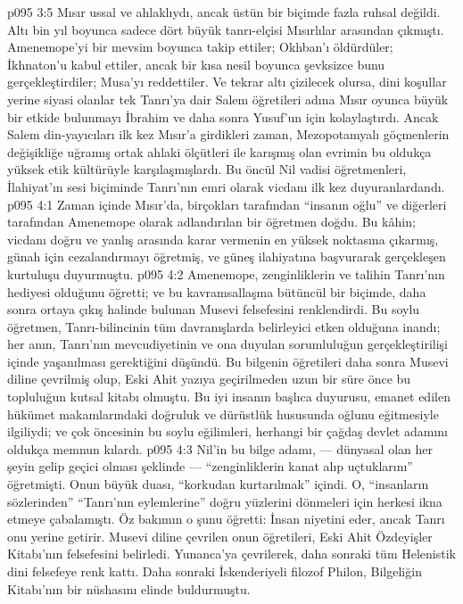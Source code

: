 \vs p095 3:5 Mısır ussal ve ahlaklıydı, ancak üstün bir biçimde fazla ruhsal değildi. Altı bin yıl boyunca sadece dört büyük tanrı\hyp{}elçisi Mısırlılar arasından çıkmıştı. Amenemope’yi bir mevsim boyunca takip ettiler; Okhban’ı öldürdüler; İkhnaton’u kabul ettiler, ancak bir kısa nesil boyunca şevksizce bunu gerçekleştirdiler; Musa’yı reddettiler. Ve tekrar altı çizilecek olursa, dini koşullar yerine siyasi olanlar tek Tanrı’ya dair Salem öğretileri adına Mısır oyunca büyük bir etkide bulunmayı İbrahim ve daha sonra Yusuf’un için kolaylaştırdı. Ancak Salem din\hyp{}yayıcıları ilk kez Mısır’a girdikleri zaman, Mezopotamyalı göçmenlerin değişikliğe uğramış ortak ahlaki ölçütleri ile karışmış olan evrimin bu oldukça yüksek etik kültürüyle karşılaşmışlardı. Bu öncül Nil vadisi öğretmenleri, İlahiyat’ın sesi biçiminde Tanrı’nın emri olarak vicdanı ilk kez duyuranlardandı.
\vs p095 4:1 Zaman içinde Mısır’da, birçokları tarafından “insanın oğlu” ve diğerleri tarafından Amenemope olarak adlandırılan bir öğretmen doğdu. Bu kâhin; vicdanı doğru ve yanlış arasında karar vermenin en yüksek noktasına çıkarmış, günah için cezalandırmayı öğretmiş, ve güneş ilahiyatına başvurarak gerçekleşen kurtuluşu duyurmuştu.
\vs p095 4:2 Amenemope, zenginliklerin ve talihin Tanrı’nın hediyesi olduğunu öğretti; ve bu kavramsallaşma bütüncül bir biçimde, daha sonra ortaya çıkış halinde bulunan Musevi felsefesini renklendirdi. Bu soylu öğretmen, Tanrı\hyp{}bilincinin tüm davranışlarda belirleyici etken olduğuna inandı; her anın, Tanrı’nın mevcudiyetinin ve ona duyulan sorumluluğun gerçekleştirilişi içinde yaşanılması gerektiğini düşündü. Bu bilgenin öğretileri daha sonra Musevi diline çevrilmiş olup, Eski Ahit yazıya geçirilmeden uzun bir süre önce bu topluluğun kutsal kitabı olmuştu. Bu iyi insanın başlıca duyurusu, emanet edilen hükümet makamlarındaki doğruluk ve dürüstlük hususunda oğlunu eğitmesiyle ilgiliydi; ve çok öncesinin bu soylu eğilimleri, herhangi bir çağdaş devlet adamını oldukça memnun kılardı.
\vs p095 4:3 Nil’in bu bilge adamı, --- dünyasal olan her şeyin gelip geçici olması şeklinde --- “zenginliklerin kanat alıp uçtuklarını” öğretmişti. Onun büyük duası, “korkudan kurtarılmak” içindi. O, “insanların sözlerinden” “Tanrı’nın eylemlerine” doğru yüzlerini dönmeleri için herkesi ikna etmeye çabalamıştı. Öz bakımın o şunu öğretti: İnsan niyetini eder, ancak Tanrı onu yerine getirir. Musevi diline çevrilen onun öğretileri, Eski Ahit Özdeyişler Kitabı’nın felsefesini belirledi. Yunanca’ya çevrilerek, daha sonraki tüm Helenistik dini felsefeye renk kattı. Daha sonraki İskenderiyeli filozof Philon, Bilgeliğin Kitabı’nın bir nüshasını elinde buldurmuştu.
